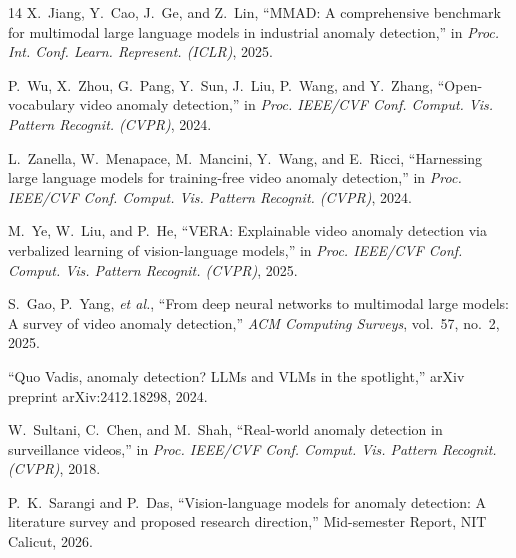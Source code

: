 \begin{thebibliography}{14}
X.~Jiang, Y.~Cao, J.~Ge, and Z.~Lin,
``MMAD: A comprehensive benchmark for multimodal large language models in industrial anomaly detection,''
in \textit{Proc. Int. Conf. Learn. Represent. (ICLR)}, 2025.

P.~Wu, X.~Zhou, G.~Pang, Y.~Sun, J.~Liu, P.~Wang, and Y.~Zhang,
``Open-vocabulary video anomaly detection,''
in \textit{Proc. IEEE/CVF Conf. Comput. Vis. Pattern Recognit. (CVPR)}, 2024.

L.~Zanella, W.~Menapace, M.~Mancini, Y.~Wang, and E.~Ricci,
``Harnessing large language models for training-free video anomaly detection,''
in \textit{Proc. IEEE/CVF Conf. Comput. Vis. Pattern Recognit. (CVPR)}, 2024.

M.~Ye, W.~Liu, and P.~He,
``VERA: Explainable video anomaly detection via verbalized learning of vision-language models,''
in \textit{Proc. IEEE/CVF Conf. Comput. Vis. Pattern Recognit. (CVPR)}, 2025.

S.~Gao, P.~Yang, \textit{et al.},
``From deep neural networks to multimodal large models: A survey of video anomaly detection,''
\textit{ACM Computing Surveys}, vol.~57, no.~2, 2025.

``Quo Vadis, anomaly detection? LLMs and VLMs in the spotlight,''
arXiv preprint arXiv:2412.18298, 2024.

W.~Sultani, C.~Chen, and M.~Shah,
``Real-world anomaly detection in surveillance videos,''
in \textit{Proc. IEEE/CVF Conf. Comput. Vis. Pattern Recognit. (CVPR)}, 2018.

P.~K.~Sarangi and P.~Das,
``Vision-language models for anomaly detection: A literature survey and proposed research direction,''
Mid-semester Report, NIT Calicut, 2026.

\end{thebibliography}


